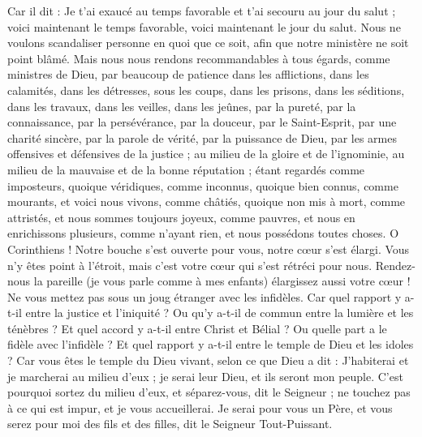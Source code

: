 \begin{multicols}{2}
Car il dit : Je t'ai exaucé au temps favorable et t'ai secouru au jour du salut ; voici maintenant le temps favorable, voici maintenant le jour du salut.
Nous ne voulons scandaliser personne en quoi que ce soit, afin que notre ministère ne soit point blâmé.
Mais nous nous rendons recommandables à tous égards, comme ministres de Dieu, par beaucoup de patience dans les afflictions, dans les calamités, dans les détresses,
sous les coups, dans les prisons, dans les séditions, dans les travaux, dans les veilles, dans les jeûnes,
par la pureté, par la connaissance, par la persévérance, par la douceur, par le Saint-Esprit, par une charité sincère,
par la parole de vérité, par la puissance de Dieu, par les armes offensives et défensives de la justice ;
au milieu de la gloire et de l'ignominie, au milieu de la mauvaise et de la bonne réputation ; étant regardés comme imposteurs, quoique véridiques,
comme inconnus, quoique bien connus, comme mourants, et voici nous vivons, comme châtiés, quoique non mis à mort,
comme attristés, et nous sommes toujours joyeux, comme pauvres, et nous en enrichissons plusieurs, comme n'ayant rien, et nous possédons toutes choses.
O Corinthiens ! Notre bouche s’est ouverte pour vous, notre cœur s'est élargi.
Vous n’y êtes point à l'étroit, mais c’est votre cœur qui s’est rétréci pour nous.
Rendez-nous la pareille (je vous parle comme à mes enfants) élargissez aussi votre cœur !
Ne vous mettez pas sous un joug étranger avec les infidèles. Car quel rapport y a-t-il entre la justice et l'iniquité ? Ou qu’y a-t-il de commun entre la lumière et les ténèbres ?
Et quel accord y a-t-il entre Christ et Bélial ? Ou quelle part a le fidèle avec l'infidèle ?
Et quel rapport y a-t-il entre le temple de Dieu et les idoles ? Car vous êtes le temple du Dieu vivant, selon ce que Dieu a dit : J'habiterai et je marcherai au milieu d'eux ; je serai leur Dieu, et ils seront mon peuple.
C'est pourquoi sortez du milieu d'eux, et séparez-vous, dit le Seigneur ; ne touchez pas à ce qui est impur, et je vous accueillerai.
Je serai pour vous un Père, et vous serez pour moi des fils et des filles, dit le Seigneur Tout-Puissant.

\end{multicols}
